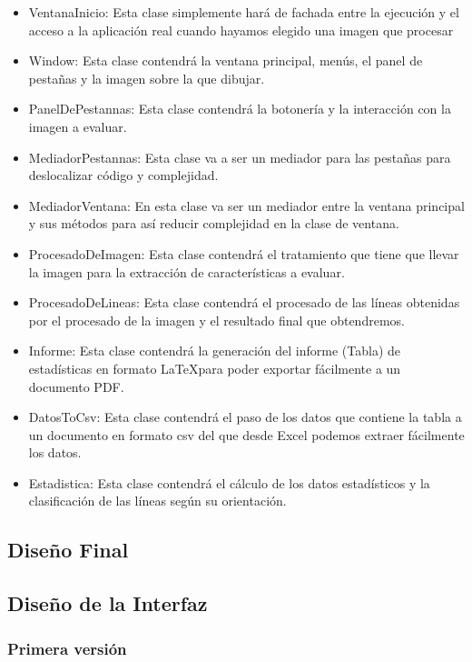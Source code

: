 \begin{itemize}
	\item VentanaInicio: 
Esta clase simplemente hará de fachada entre la ejecución y el acceso a la aplicación real cuando hayamos elegido una imagen que procesar
	\item Window:
Esta clase contendrá la ventana principal, menús, el panel de pestañas y la imagen sobre la que dibujar.
	\item PanelDePestannas:
Esta clase contendrá la botonería y la interacción con la imagen a evaluar.
	\item MediadorPestannas:
Esta clase va a ser un mediador para las pestañas para deslocalizar código y complejidad.
	\item MediadorVentana:
En esta clase va ser un mediador entre la ventana principal y sus métodos para así reducir complejidad en la clase de ventana.
	\item ProcesadoDeImagen:
Esta clase contendrá el tratamiento que tiene que llevar la imagen para la extracción de características a evaluar.
	\item ProcesadoDeLineas:
Esta clase contendrá el procesado de las líneas obtenidas por el procesado de la imagen y el resultado final que obtendremos.
	\item Informe: 
Esta clase contendrá la generación del informe (Tabla) de estadísticas en formato \LaTeX para poder exportar fácilmente a un documento PDF.
	\item DatosToCsv:
Esta clase contendrá el paso de los datos que contiene la tabla a un documento en formato csv del que desde Excel podemos extraer fácilmente los datos.
	\item Estadistica: 
Esta clase contendrá el cálculo de los datos estadísticos y la clasificación de las líneas según su orientación.
\end{itemize}


\subsection{Diseño Final}



\subsection{Diseño de la Interfaz}

\subsubsection{Primera versión}

